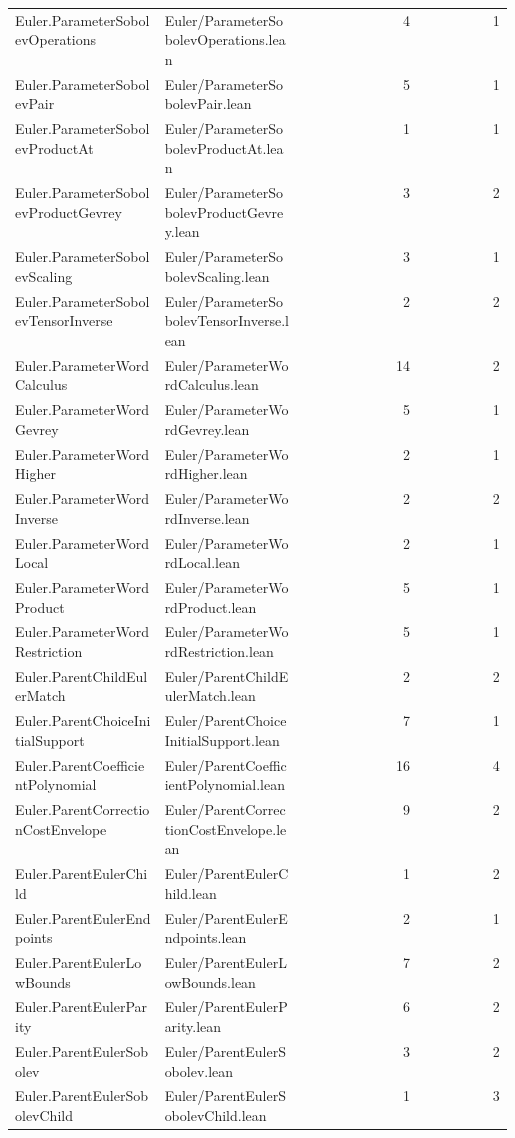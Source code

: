 \begin{longtable}{p{0.30\linewidth}p{0.28\linewidth}rr}
Euler.ParameterSobolevOperations & Euler/ParameterSobolevOperations.lean & 4 & 1\\
Euler.ParameterSobolevPair & Euler/ParameterSobolevPair.lean & 5 & 1\\
Euler.ParameterSobolevProductAt & Euler/ParameterSobolevProductAt.lean & 1 & 1\\
Euler.ParameterSobolevProductGevrey & Euler/ParameterSobolevProductGevrey.lean & 3 & 2\\
Euler.ParameterSobolevScaling & Euler/ParameterSobolevScaling.lean & 3 & 1\\
Euler.ParameterSobolevTensorInverse & Euler/ParameterSobolevTensorInverse.lean & 2 & 2\\
Euler.ParameterWordCalculus & Euler/ParameterWordCalculus.lean & 14 & 2\\
Euler.ParameterWordGevrey & Euler/ParameterWordGevrey.lean & 5 & 1\\
Euler.ParameterWordHigher & Euler/ParameterWordHigher.lean & 2 & 1\\
Euler.ParameterWordInverse & Euler/ParameterWordInverse.lean & 2 & 2\\
Euler.ParameterWordLocal & Euler/ParameterWordLocal.lean & 2 & 1\\
Euler.ParameterWordProduct & Euler/ParameterWordProduct.lean & 5 & 1\\
Euler.ParameterWordRestriction & Euler/ParameterWordRestriction.lean & 5 & 1\\
Euler.ParentChildEulerMatch & Euler/ParentChildEulerMatch.lean & 2 & 2\\
Euler.ParentChoiceInitialSupport & Euler/ParentChoiceInitialSupport.lean & 7 & 1\\
Euler.ParentCoefficientPolynomial & Euler/ParentCoefficientPolynomial.lean & 16 & 4\\
Euler.ParentCorrectionCostEnvelope & Euler/ParentCorrectionCostEnvelope.lean & 9 & 2\\
Euler.ParentEulerChild & Euler/ParentEulerChild.lean & 1 & 2\\
Euler.ParentEulerEndpoints & Euler/ParentEulerEndpoints.lean & 2 & 1\\
Euler.ParentEulerLowBounds & Euler/ParentEulerLowBounds.lean & 7 & 2\\
Euler.ParentEulerParity & Euler/ParentEulerParity.lean & 6 & 2\\
Euler.ParentEulerSobolev & Euler/ParentEulerSobolev.lean & 3 & 2\\
Euler.ParentEulerSobolevChild & Euler/ParentEulerSobolevChild.lean & 1 & 3\\

\end{longtable}
